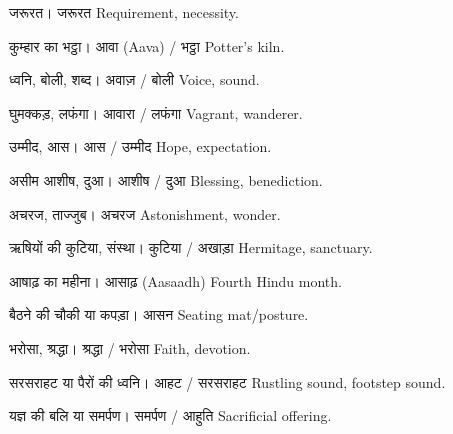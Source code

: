 %
{जरूरत।}%
{जरूरत}%
{Requirement, necessity.}

%
{कुम्हार का भट्ठा।}%
{आवा (Aava) / भट्ठा}%
{Potter's kiln.}

%
{ध्वनि, बोली, शब्द।}%
{अवाज़ / बोली}%
{Voice, sound.}

%
{घुमक्कड़, लफंगा।}%
{आवारा / लफंगा}%
{Vagrant, wanderer.}

%
{उम्मीद, आस।}%
{आस / उम्मीद}%
{Hope, expectation.}

%
{असीम आशीष, दुआ।}%
{आशीष / दुआ}%
{Blessing, benediction.}

%
{अचरज, ताज्जुब।}%
{अचरज}%
{Astonishment, wonder.}

%
{ऋषियों की कुटिया, संस्था।}%
{कुटिया / अखाड़ा}%
{Hermitage, sanctuary.}

%
{आषाढ़ का महीना।}%
{आसाढ़ (Aasaadh)}%
{Fourth Hindu month.}

%
{बैठने की चौकी या कपड़ा।}%
{आसन}%
{Seating mat/posture.}

%
{भरोसा, श्रद्धा।}%
{श्रद्धा / भरोसा}%
{Faith, devotion.}

%
{सरसराहट या पैरों की ध्वनि।}%
{आहट / सरसराहट}%
{Rustling sound, footstep sound.}

%
{यज्ञ की बलि या समर्पण।}%
{समर्पण / आहुति}%
{Sacrificial offering.}
